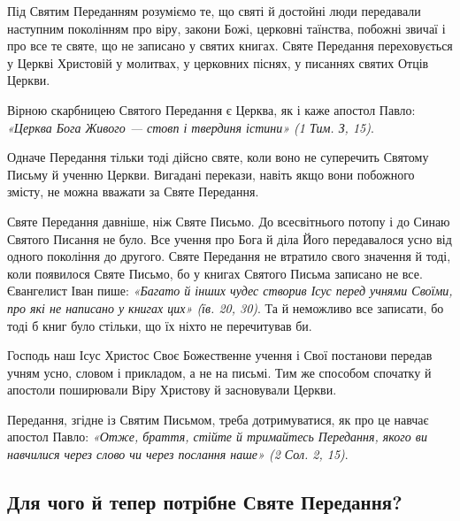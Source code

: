 \documentclass[main.tex]{subfiles}
\begin{document}
Під Святим Переданням розуміємо те, що святі й достойні люди передавали наступним поколінням про віру, закони Божі, церковні таїнства, побожні звичаї і про все те святе, що не записано у святих книгах. Святе Передання переховується у Церкві Христовій у молитвах, у церковних піснях, у писаннях святих Отців Церкви.

Вірною скарбницею Святого Передання є Церква, як і каже апостол Павло: \emph{«Церква Бога Живого — стовп і твердиня істини» (1 Тим. З, 15)}.

Одначе Передання тільки тоді дійсно святе, коли воно не суперечить Святому Письму й ученню Церкви. Вигадані перекази, навіть якщо вони побожного змісту, не можна вважати за Святе Передання.

Святе Передання давніше, ніж Святе Письмо. До всесвітнього потопу і до Синаю Святого Писання не було. Все учення про Бога й діла Його передавалося усно від одного покоління до другого. Святе Передання не втратило свого значення й тоді, коли появилося Святе Письмо, бо у книгах Святого Письма записано не все. Євангелист Іван пише: \emph{«Багато й інших чудес створив Ісус перед учнями Своїми, про які не написано у книгах цих» (їв. 20, 30)}. Та й неможливо все записати, бо тоді б книг було стільки, що їх ніхто не перечитував би.

Господь наш Ісус Христос Своє Божественне учення і Свої постанови передав учням усно, словом і прикладом, а не на письмі. Тим же способом спочатку й апостоли поширювали Віру Христову й засновували Церкви.

Передання, згідне із Святим Письмом, треба дотримуватися, як про це навчає апостол Павло: \emph{«Отже, браття, стійте й тримайтесь Передання, якого ви навчилися через слово чи через послання наше» (2 Сол. 2, 15)}.

\subsection{Для чого й тепер потрібне Святе Передання?}
\end{document}
